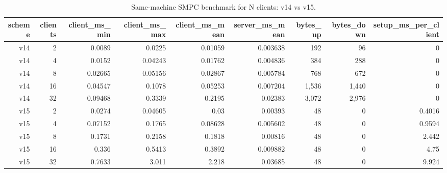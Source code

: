 \begin{table}[t]
\centering
\small
\caption{Same-machine SMPC benchmark for N clients: v14 vs v15.}
\label{tab:smpc_bench}
\begin{tabular}{rrrrrrrrr}
\toprule
scheme & clients & client\_ms\_min & client\_ms\_max & client\_ms\_mean & server\_ms\_mean & bytes\_up & bytes\_down & setup\_ms\_per\_client \\
\midrule
v14 & 2 & 0.0089 & 0.0225 & 0.01059 & 0.003638 & 192 & 96 & 0 \\
v14 & 4 & 0.0152 & 0.04243 & 0.01762 & 0.004836 & 384 & 288 & 0 \\
v14 & 8 & 0.02665 & 0.05156 & 0.02867 & 0.005784 & 768 & 672 & 0 \\
v14 & 16 & 0.04547 & 0.1078 & 0.05253 & 0.007204 & 1,536 & 1,440 & 0 \\
v14 & 32 & 0.09468 & 0.3339 & 0.2195 & 0.02383 & 3,072 & 2,976 & 0 \\
v15 & 2 & 0.0274 & 0.04605 & 0.03 & 0.00393 & 48 & 0 & 0.4016 \\
v15 & 4 & 0.07152 & 0.1765 & 0.08628 & 0.005602 & 48 & 0 & 0.9594 \\
v15 & 8 & 0.1731 & 0.2158 & 0.1818 & 0.00816 & 48 & 0 & 2.442 \\
v15 & 16 & 0.336 & 0.5413 & 0.3892 & 0.009882 & 48 & 0 & 4.75 \\
v15 & 32 & 0.7633 & 3.011 & 2.218 & 0.03685 & 48 & 0 & 9.924 \\
\bottomrule
\end{tabular}
\end{table}
